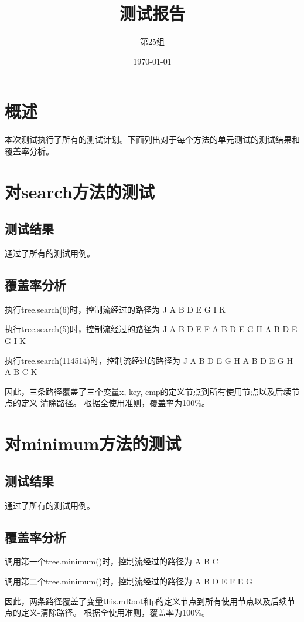 \documentclass[12pt, a4paper, oneside]{ctexart}
\title{\textbf{测试报告}}
\author{第25组}
\date{\today}
\begin{document}
\maketitle

\section{概述}
本次测试执行了所有的测试计划。下面列出对于每个方法的单元测试的测试结果和覆盖率分析。

\section{对search方法的测试}

\subsection{测试结果}
通过了所有的测试用例。

\subsection{覆盖率分析}
执行tree.search(6)时，控制流经过的路径为 J A B D E G I K

执行tree.search(5)时，控制流经过的路径为 J A B D E F A B D E G H A B D E G I K

执行tree.search(114514)时，控制流经过的路径为 J A B D E G H A B D E G H A B C K

因此，三条路径覆盖了三个变量x, key, cmp的定义节点到所有使用节点以及后续节点的定义-清除路径。
根据全使用准则，覆盖率为100\%。

\section{对minimum方法的测试}

\subsection{测试结果}
通过了所有的测试用例。

\subsection{覆盖率分析}
调用第一个tree.minimum()时，控制流经过的路径为 A B C

调用第二个tree.minimum()时，控制流经过的路径为 A B D E F E G

因此，两条路径覆盖了变量this.mRoot和p的定义节点到所有使用节点以及后续节点的定义-清除路径。
根据全使用准则，覆盖率为100\%。
\end{document}
